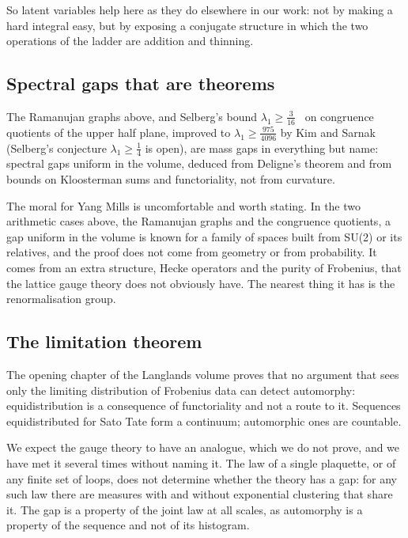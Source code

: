 So latent variables help here as they do elsewhere in our work: not by making a hard integral easy, but by exposing a conjugate structure in which the two operations of the ladder are addition and thinning.

\subsection{Spectral gaps that are theorems}

The Ramanujan graphs above, and Selberg's bound $\lambda_1\ge\frac3{16}$~\cite{Se65} on congruence quotients of the upper half plane, improved to $\lambda_1\ge\frac{975}{4096}$ by Kim and Sarnak~\cite{KS03} (Selberg's conjecture $\lambda_1\ge\frac14$ is open), are mass gaps in everything but name: spectral gaps uniform in the volume, deduced from Deligne's theorem and from bounds on Kloosterman sums and functoriality, not from curvature.

The moral for Yang Mills is uncomfortable and worth stating. In the two arithmetic cases above, the Ramanujan graphs and the congruence quotients, a gap uniform in the volume is known for a family of spaces built from SU(2) or its relatives, and the proof does not come from geometry or from probability. It comes from an extra structure, Hecke operators and the purity of Frobenius, that the lattice gauge theory does not obviously have. The nearest thing it has is the renormalisation group.

\subsection{The limitation theorem}

The opening chapter of the Langlands volume proves that no argument that sees only the limiting distribution of Frobenius data can detect automorphy: equidistribution is a consequence of functoriality and not a route to it. Sequences equidistributed for Sato Tate form a continuum; automorphic ones are countable.

We expect the gauge theory to have an analogue, which we do not prove, and we have met it several times without naming it. The law of a single plaquette, or of any finite set of loops, does not determine whether the theory has a gap: for any such law there are measures with and without exponential clustering that share it. The gap is a property of the joint law at all scales, as automorphy is a property of the sequence and not of its histogram.

